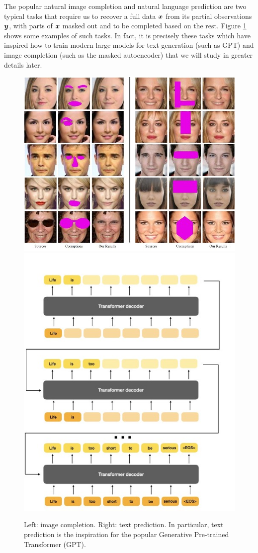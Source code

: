 \documentclass[../../book-main.tex]{subfiles}
\begin{document}
\begin{example}
The popular natural image completion and natural language prediction are two typical tasks that require us to recover a full data $\bm{x}$ from its partial observations $\bm{y}$, with parts of $\bm{x}$ masked out and to be completed based on the rest. Figure \ref{fig:image-text-completion} shows some examples of such tasks. In fact, it is precisely these tasks which have inspired how to train modern large models for text generation (such as GPT) and image completion (such as the masked autoencoder) that we will study in greater details later.
    \begin{figure}
        \centering
        \includegraphics[height=0.4\linewidth]{figs_chap6/image-completion.jpg} \hspace{10mm} \includegraphics[height=0.45\linewidth]{figs_chap6/text-prediction.jpg}
        \caption{Left: image completion. Right: text prediction. In particular, text prediction is the inspiration for the popular Generative Pre-trained Transformer (GPT).}
        \label{fig:image-text-completion}
    \end{figure}
\end{example}
\end{document}
